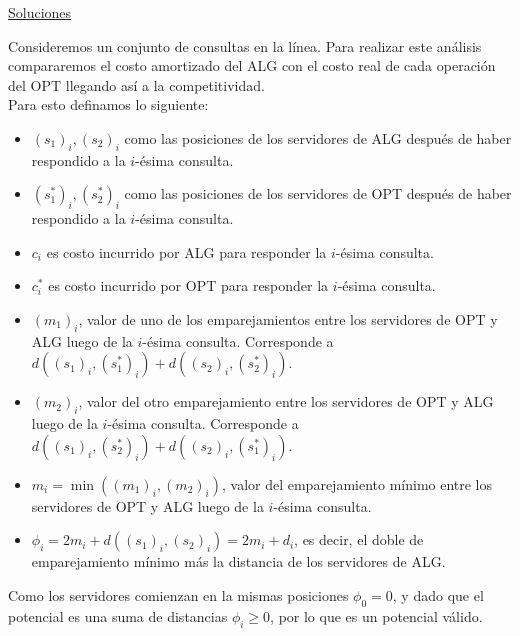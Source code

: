 \documentclass[dcc,uchile]{fcfmcourse}
\theoremstyle{plain}
\theoremstyle{definition}
\begin{document}
\newpage
\begin{center}
{\huge \underline{Soluciones}}
\end{center}
\begin{problems}
\item Consideremos un conjunto de consultas en la línea. Para realizar este análisis compararemos el costo amortizado del ALG con el costo real de cada operación del OPT llegando así a la competitividad.\\
Para esto definamos lo siguiente:
\begin{itemize}
    \item $(s_{1})_{i}, (s_{2})_{i}$ como las posiciones de los servidores de ALG después de haber respondido a la $i$-ésima consulta.
    \item $(s_{1}^*)_{i}, (s_{2}^*)_{i}$ como las posiciones de los servidores de OPT después de haber respondido a la $i$-ésima consulta.
    \item $c_{i}$ es costo incurrido por ALG para responder la $i$-ésima consulta.
    \item $c^*_{i}$ es costo incurrido por OPT para responder la $i$-ésima consulta.
    \item $(m_{1})_{i}$, valor de uno de los emparejamientos entre los servidores de OPT y ALG luego de la $i$-ésima consulta. Corresponde a $d((s_{1})_{i},(s_{1}^*)_{i}) + d((s_{2})_{i},(s_{2}^*)_{i})$.
    \item $(m_{2})_{i}$, valor del otro emparejamiento entre los servidores de OPT y ALG luego de la $i$-ésima consulta. Corresponde a $d((s_{1})_{i},(s_{2}^*)_{i}) + d((s_{2})_{i},(s_{1}^*)_{i})$.
    \item $m_{i} = \min((m_{1})_{i}, (m_{2})_{i})$, valor del emparejamiento mínimo entre los servidores de OPT y ALG luego de la $i$-ésima consulta.
    \item $\phi_{i} = 2m_{i} + d((s_{1})_{i}, (s_{2})_{i}) = 2m_{i} + d_{i}$, es decir, el doble de emparejamiento mínimo más la distancia de los servidores de ALG.
\end{itemize}
Como los servidores comienzan en la mismas posiciones $\phi_{0} = 0$, y dado que el potencial es una suma de distancias $\phi_{i}\ge 0$, por lo que es un potencial válido.\\


\end{problems}
\end{document}
